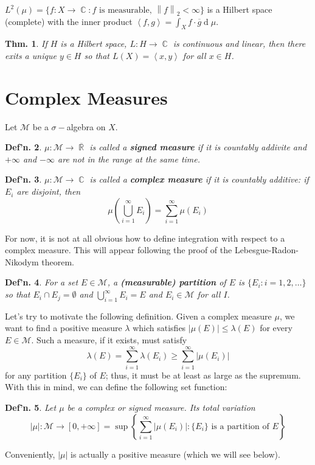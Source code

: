 \documentclass[12pt, a4paper]{book}
\DeclareMathOperator{\R}{\mathbb{R}}
\DeclareMathOperator{\C}{\mathbb{C}}
\renewcommand{\d}[1]{\ensuremath{\operatorname{d}\!{#1}}} %
\newcommand{\inner}[2]{\left\langle #1, #2 \right\rangle} %
\newcommand{\norm}[1]{\left\lVert#1\right\rVert} %
\newtheorem{theorem}{Thm.}[section]
\newtheorem{definition}[theorem]{Def'n.}
\theoremstyle{nonumberplain}
\begin{document}
$L^2(\mu)=\{f:X\to\C:f\text{ is measurable, $\norm{f}_2<\infty$}\}$ is a Hilbert space (complete) with the inner product $\inner{f}{g}=\int_Xf\cdot\overline{g}\d{\mu}$.
\begin{theorem}
    If $H$ is a Hilbert space, $L:H\to\C$ is continuous and linear, then there exits a unique $y\in H$ so that $L(X)=\inner{x}{y}$ for all $x\in H$.
\end{theorem}
\section{Complex Measures}
Let $\mathcal{M}$ be a $\sigma-$algebra on $X$.
\begin{definition}
    $\mu:\mathcal{M}\to\overline{\R}$ is called a \textbf{signed measure} if it is countably addivite and $+\infty$ and $-\infty$ are not in the range at the same time.
\end{definition}
\begin{definition}
    $\mu:\mathcal{M}\to\C$ is called a \textbf{complex measure} if it is countably additive: if $E_i$ are disjoint, then
    \[\mu\left(\bigcup\limits_{i=1}^\infty E_i\right)=\sum\limits_{i=1}^\infty \mu(E_i)\]
\end{definition}
For now, it is not at all obvious how to define integration with respect to a complex measure.
This will appear following the proof of the Lebesgue-Radon-Nikodym theorem.
\begin{definition}
    For a set $E\in\mathcal{M}$, a \textbf{(measurable) partition} of $E$ is $\{E_i:i=1,2,\ldots\}$ so that $E_i\cap E_j=\emptyset$ and $\bigcup_{i=1}^\infty E_i=E$ and $E_i\in\mathcal{M}$ for all $I$.
\end{definition}
Let's try to motivate the following definition.
Given a complex measure $\mu$, we want to find a positive measure $\lambda$ which satisfies $|\mu(E)|\leq\lambda(E)$ for every $E\in\mathcal{M}$.
Such a measure, if it exists, must satisfy
\[\lambda(E)=\sum\limits_{i=1}^\infty\lambda(E_i)\geq\sum\limits_{i=1}^\infty|\mu(E_i)|\]
for any partition $\{E_i\}$ of $E$; thus, it must be at least as large as the supremum.
With this in mind, we can define the following set function:
\begin{definition}
    Let $\mu$ be a complex or signed measure.
    Its total variation
    \[|\mu|:\mathcal{M}\to[0,+\infty]=\sup\left\{\sum\limits_{i=1}^\infty |\mu(E_i)|:\{E_i\}\text{ is a partition of $E$}\right\}\]
\end{definition}
Conveniently, $|\mu|$ is actually a positive measure (which we will see below).
\end{document}
